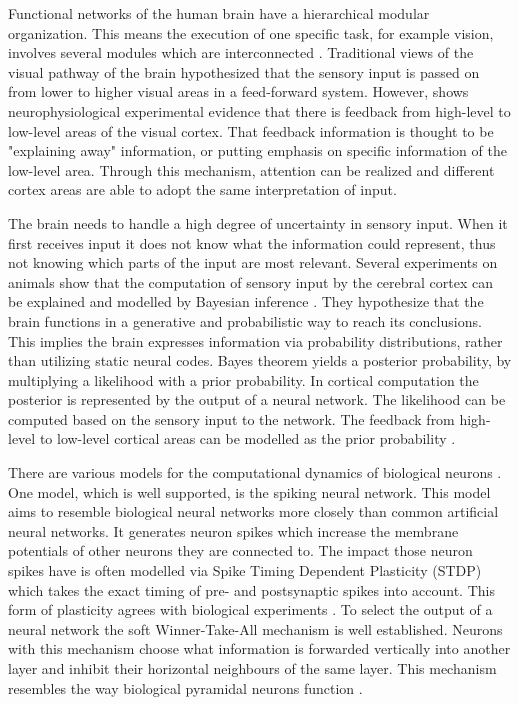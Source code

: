 Functional networks of the human brain have a hierarchical modular organization. This means the execution of one specific task, for example vision, involves several modules which are interconnected  \citep{hierarchicalBrain}. Traditional views of the visual pathway of the brain hypothesized that the sensory input is passed on from lower to higher visual areas in a feed-forward system. However, \citet{HierachicalBayesVisualCortex} shows  neurophysiological experimental evidence that there is feedback from high-level to low-level areas of the visual cortex. That feedback information is thought to be "explaining away" information, or putting emphasis on specific information of the low-level area. Through this mechanism, attention can be realized and different cortex areas are able to adopt the same interpretation of  input.
 
The brain needs to handle a high degree of uncertainty in sensory input. When it first receives input it does not know what the information could represent, thus not knowing which parts of the input are most relevant. Several experiments on animals show that the computation of sensory input by the cerebral cortex can be explained and modelled by Bayesian inference \citep{neuralSubstrate, HierachicalBayesVisualCortex, anatomyOfInference}. They hypothesize that the brain functions in a generative and probabilistic way to reach its conclusions. This implies the brain expresses information via probability distributions, rather than utilizing static neural codes. 
Bayes theorem yields a posterior probability, by multiplying a likelihood with a prior probability. In cortical computation the posterior is  represented by the output of a neural network. The likelihood can be computed based on the sensory input to the network. The feedback from high-level to low-level cortical areas can be modelled as the prior probability \citep{nessler}.

There are various models for the computational dynamics of biological neurons \citep{SpikingNeuronModelsBook}. One model, which is well supported, is the spiking neural network. This model aims to resemble biological neural networks more closely than common artificial neural networks. It generates neuron spikes which increase the membrane potentials of other neurons they are connected to. The impact those neuron spikes have is often modelled via Spike Timing Dependent Plasticity (STDP) which takes the exact timing of pre- and postsynaptic spikes into account. This form of plasticity agrees with biological experiments \citep{STDPFELDMAN, STDPDAN}. To select the output of a neural network the soft Winner-Take-All mechanism is well established. Neurons with this mechanism choose what information is forwarded vertically into another layer and inhibit their horizontal neighbours of the same layer. This mechanism resembles the way biological pyramidal neurons function \citep{softWTA}.

